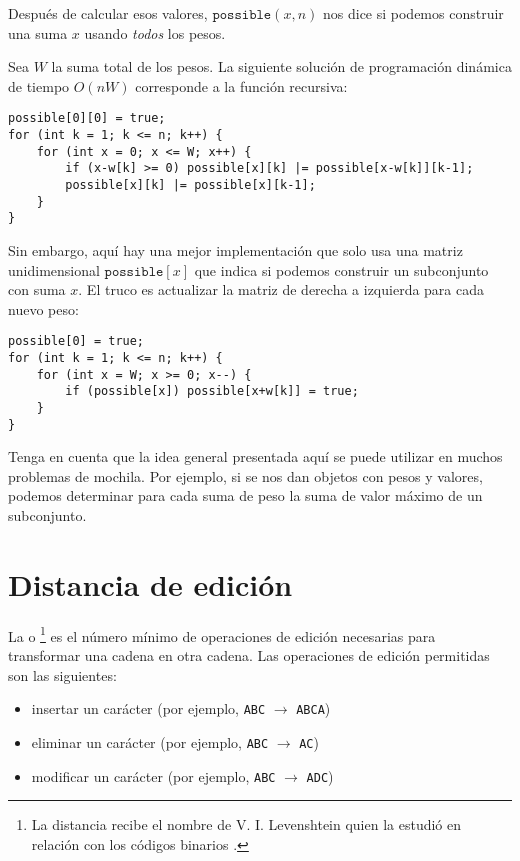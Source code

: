 Después de calcular esos valores, $\texttt{possible}(x,n)$
nos dice si podemos construir una
suma $x$ usando \emph{todos} los pesos.

Sea $W$ la suma total de los pesos.
La siguiente solución de programación dinámica de tiempo $O(nW)$
corresponde a la función recursiva:
\begin{lstlisting}
possible[0][0] = true;
for (int k = 1; k <= n; k++) {
    for (int x = 0; x <= W; x++) {
        if (x-w[k] >= 0) possible[x][k] |= possible[x-w[k]][k-1];
        possible[x][k] |= possible[x][k-1];
    }
}
\end{lstlisting}

Sin embargo, aquí hay una mejor implementación que solo usa
una matriz unidimensional $\texttt{possible}[x]$
que indica si podemos construir un subconjunto con suma $x$.
El truco es actualizar la matriz de derecha a izquierda para
cada nuevo peso:
\begin{lstlisting}
possible[0] = true;
for (int k = 1; k <= n; k++) {
    for (int x = W; x >= 0; x--) {
        if (possible[x]) possible[x+w[k]] = true;
    }
}
\end{lstlisting}

Tenga en cuenta que la idea general presentada aquí se puede utilizar
en muchos problemas de mochila.
Por ejemplo, si se nos dan objetos con pesos y valores,
podemos determinar para cada suma de peso la suma de valor máximo
de un subconjunto.

\section{Distancia de edición}


La  o \footnote{La distancia
recibe el nombre de V. I. Levenshtein quien la estudió en relación con los códigos binarios \cite{lev66}.}
es el número mínimo de operaciones de edición
necesarias para transformar una cadena
en otra cadena.
Las operaciones de edición permitidas son las siguientes:
\begin{itemize}
\item insertar un carácter (por ejemplo, \texttt{ABC} $\rightarrow$ \texttt{ABCA})
\item eliminar un carácter (por ejemplo, \texttt{ABC} $\rightarrow$ \texttt{AC})
\item modificar un carácter (por ejemplo, \texttt{ABC} $\rightarrow$ \texttt{ADC})
\end{itemize}

